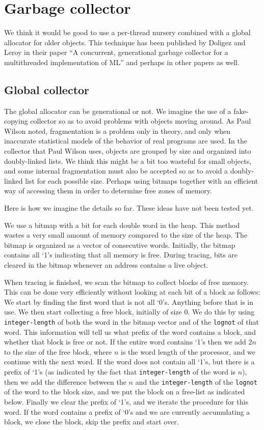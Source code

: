 \chapter{Garbage collector}

We think it would be good to use a per-thread nursery combined with a
global allocator for older objects.  This technique has been published
by Doligez and Leroy in their paper ``A concurrent, generational
garbage collector for a multithreaded implementation of ML'' and
perhaps in other papers as well.

\section{Global collector}
The global allocator can be generational or not.  We imagine the use
of a fake-copying collector so as to avoid problems with objects
moving around.  As Paul Wilson noted, fragmentation is a problem only
in theory, and only when inaccurate statistical models of the behavior
of real programs are used.  In the collector that Paul Wilson uses,
objects are grouped by size and organized into doubly-linked lists.
We think this might be a bit too wasteful for small objects, and some
internal fragmentation must also be accepted so as to avoid a
doubly-linked list for each possible size.  Perhaps using bitmaps
together with an efficient way of accessing them in order to determine
free zones of memory.

Here is how we imagine the details so far.  These ideas have not been
tested yet. 

We use a bitmap with a bit for each double word in the heap.  This
method wastes a very small amount of memory compared to the size of
the heap.  The bitmap is organized as a vector of consecutive words.
Initially, the bitmap contains all `1's indicating that all memory is
free.  During tracing, bits are cleared in the bitmap
whenever an address contains a live object.

When tracing is finished, we scan the bitmap to collect blocks of free
memory.  This can be done very efficiently without looking at each bit
of a block as follows: We start by finding the first word that is not
all `0's.  Anything before that is in use.  We then start collecting a
free block, initially of size 0. We do this by using
\texttt{integer-length} of both the word in the bitmap vector and of
the \texttt{lognot} of that word.  This information will tell us what
prefix of the word contains a block, and whether that block is free or
not.  If the entire word contains `1's then we add $2n$ to the size of
the free block, where $n$ is the word length of the processor, and we
continue with the next word.  If the word does not contain all `1's,
but there is a prefix of `1's (as indicated by the fact that
\texttt{integer-length} of the word is $n$), then we add the
difference between the $n$ and the \texttt{integer-length} of the
\texttt{lognot} of the word to the block size, and we put the block on
a free-list as indicated below.  Finally we clear the prefix of `1's,
and we iterate the procedure for this word.  If the word contains a
prefix of `0's and we are currently accumulating a block, we close the
block, skip the prefix and start over.  

